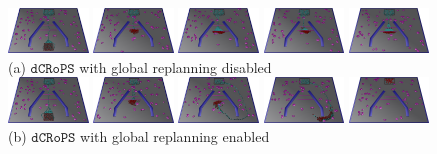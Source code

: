 \documentclass[letterpaper, 10pt, conference]{ieeeconf}
\newcommand{\Acronym}[1]{\ensuremath{{{\texttt{#1}}}}}
\newcommand{\Name}{\Acronym{dCRoPS}}
\begin{document}
\begin{figure}
\centering
\includegraphics[width=0.19\textwidth]{usef/figDno_Inter1_scaled.jpg}
\includegraphics[width=0.19\textwidth]{usef/figDno_Inter2_scaled.jpg}
\includegraphics[width=0.19\textwidth]{usef/figDno_Inter3_scaled.jpg}
\includegraphics[width=0.19\textwidth]{usef/figDno_Inter4_scaled.jpg}
\includegraphics[width=0.19\textwidth]{usef/figDno_Inter5_scaled.jpg}\\
{\footnotesize{(a) $\Name$ with global replanning disabled}}\\[2mm]

\includegraphics[width=0.19\textwidth]{usef/figD_Inter1_scaled.jpg}
\includegraphics[width=0.19\textwidth]{usef/figD_Inter2_scaled.jpg}
\includegraphics[width=0.19\textwidth]{usef/figD_Inter3_scaled.jpg}
\includegraphics[width=0.19\textwidth]{usef/figD_Inter4_scaled.jpg}
\includegraphics[width=0.19\textwidth]{usef/figD_Inter6_scaled.jpg}\\
{\footnotesize{(b) $\Name$ with global replanning enabled}}


\end{figure}
\end{document}
